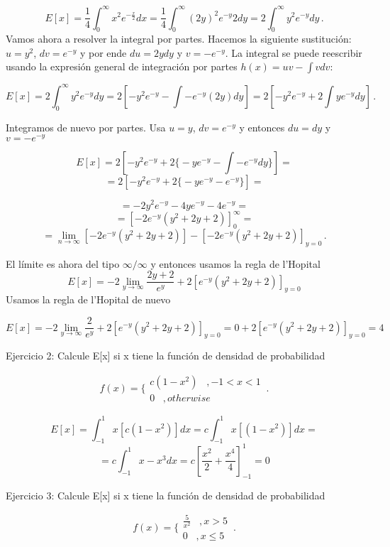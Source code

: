 \documentclass[
]{agujournal2019}
\begin{document}
\[E[x]=\frac{1}{4}\int^\infty_0 x^2e^{-\frac{x}{2}}dx
        =\frac{1}{4}\int^\infty_0 (2y)^2e^{-y}2dy
    =2\int^\infty_0y^2e^{-y}dy\,.\] Vamos ahora a resolver la integral
por partes. Hacemos la siguiente sustitución: \(u=y^2\), \(dv=e^{-y}\) y
por ende \(du=2ydy\) y \(v=-e^{-y}\). La integral se puede reescribir
usando la expresión general de integración por partes
\(h(x)=uv-\int vdv\):

\[E[x]=2\int^\infty_0y^2e^{-y}dy=2\left[ -y^2e^{-y}-\int-e^{-y}(2y)dy\right]
      =2\left[ -y^2e^{-y}+2\int ye^{-y}dy\right]\,.\]

Integramos de nuevo por partes. Usa \(u=y\), \(dv=e^{-y}\) y entonces
\(du=dy\) y \(v=-e^{-y}\)

\[E[x]=2\left[ -y^2 e^{-y} + 2 \Big\{ -y e^{-y} - \int -e^{-y}dy \Big\} \right]=\]
\[=2\left[ -y^2 e^{-y} + 2 \Big\{ -y e^{-y} - e^{-y}         \Big\} \right]=\]

\[=-2y^2e^{-y}-4ye^{-y}-4e^{-y}=\]
\[=\left[ -2e^{-y}(y^2+2y+2) \right]^{\infty}_0=\]
\[=\lim_{n \to\infty}\left[ -2e^{-y}(y^2+2y+2) \right]-\left[ -2e^{-y}(y^2+2y+2) \right]_{y=0}\,.\]

El límite es ahora del tipo \(\infty/\infty\) y entonces usamos la regla
de l'Hopital
\[E[x]=-2\lim_{y \to\infty}\frac{2y+2}{e^y}+2\left[e^{-y}(y^2+2y+2) \right]_{y=0}\]
Usamos la regla de l'Hopital de nuevo

\[E[x]=-2\lim_{y \to\infty}\frac{2}{e^y}+2\left[e^{-y}(y^2+2y+2) \right]_{y=0}=0+2\left[e^{-y}(y^2+2y+2) \right]_{y=0}=4\]

\vspace{0.5cm}

Ejercicio 2: Calcule E{[}x{]} si x tiene la función de densidad de
probabilidad

\[f(x)=\Bigg\{\begin{array}{c}
 c(1-x^2)\,\,\,\,\,,-1<x<1 \\ 0 \,\,\,\,\,,otherwise
       \end{array} \,.\]

\[E[x]=\int^1_{-1} x[c(1-x^2)]dx=c \int^1_{-1} x[(1-x^2)]dx=\]
\[=c \int^1_{-1} x-x^3dx=c\left[\frac{x^2}{2}+\frac{x^4}{4}\right]^{1}_{-1}=0\]

\vspace{0.5cm}

Ejercicio 3: Calcule E{[}x{]} si x tiene la función de densidad de
probabilidad

\[f(x)=\Bigg\{\begin{array}{c}
 \frac{5}{x^2}\,\,\,\,\,,x>5 \\ 0 \,\,\,\,\,,x\le5
       \end{array} \,.\]
\end{document}

